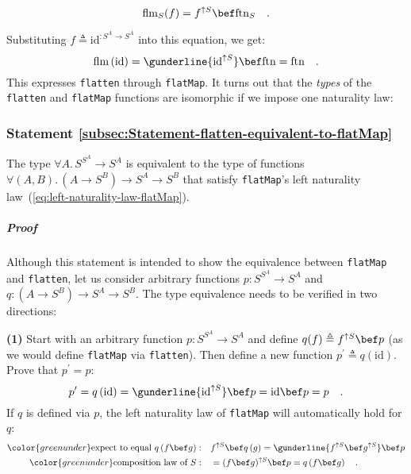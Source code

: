 ~\vspace{-0.5\baselineskip}
\[
\text{flm}_{S}(f)=f^{\uparrow S}\bef\text{ftn}_{S}\quad.
\]

\noindent Substituting $f\triangleq\text{id}^{:S^{A}\rightarrow S^{A}}$
into this equation, we get:
\[
\text{flm}\left(\text{id}\right)=\gunderline{\text{id}^{\uparrow S}}\bef\text{ftn}=\text{ftn}\quad.
\]
This expresses \lstinline!flatten! through \lstinline!flatMap!.
It turns out that the \emph{types} of the \lstinline!flatten! and
\lstinline!flatMap! functions are isomorphic if we impose one naturality
law:

\subsubsection{Statement \label{subsec:Statement-flatten-equivalent-to-flatMap}\ref{subsec:Statement-flatten-equivalent-to-flatMap}}

The type $\forall A.\,S^{S^{A}}\rightarrow S^{A}$ is equivalent
to the type of functions $\forall(A,B).\,(A\rightarrow S^{B})\rightarrow S^{A}\rightarrow S^{B}$
that satisfy \lstinline!flatMap!\textsf{'}s left naturality law~(\ref{eq:left-naturality-law-flatMap}).

\subparagraph{Proof}

\noindent Although this statement is intended to show the equivalence
between \lstinline!flatMap! and \lstinline!flatten!, let us consider
arbitrary functions $p:S^{S^{A}}\rightarrow S^{A}$ and $q:(A\rightarrow S^{B})\rightarrow S^{A}\rightarrow S^{B}$.
The type equivalence needs to be verified in two directions:

\textbf{(1)} Start with an arbitrary function $p:S^{S^{A}}\rightarrow S^{A}$
and define $q(f)\triangleq f^{\uparrow S}\bef p$ (as we would define
\lstinline!flatMap! via \lstinline!flatten!). Then define a new
function $p^{\prime}\triangleq q\left(\text{id}\right)$. Prove that
$p^{\prime}=p$:
\[
p^{\prime}=q\left(\text{id}\right)=\gunderline{\text{id}^{\uparrow S}}\bef p=\text{id}\bef p=p\quad.
\]
If $q$ is defined via $p$, the left naturality law of \lstinline!flatMap!
will automatically hold for $q$:
\begin{align*}
{\color{greenunder}\text{expect to equal }q\left(f\bef g\right):}\quad & f^{\uparrow S}\bef q\left(g\right)=\gunderline{f^{\uparrow S}\bef g^{\uparrow S}}\bef p\\
{\color{greenunder}\text{composition law of }S:}\quad & =(f\bef g)^{\uparrow S}\bef p=q\left(f\bef g\right)\quad.
\end{align*}

